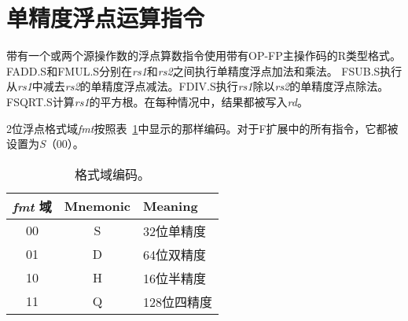 \section{单精度浮点运算指令}
\label{sec:single-float-compute}

带有一个或两个源操作数的浮点算数指令使用带有OP-FP主操作码的R类型格式。
FADD.S和FMUL.S分别在{\em rs1}和{\em rs2}之间执行单精度浮点加法和乘法。
FSUB.S执行从{\em rs1}中减去{\em rs2}的单精度浮点减法。FDIV.S执行{\em rs1}除以{\em rs2}的单精度浮点除法。
FSQRT.S计算{\em rs1}的平方根。在每种情况中，结果都被写入{\em rd}。

2位浮点格式域{\em fmt}按照表~\ref{tab:fmt}中显示的那样编码。对于F扩展中的所有指令，它都被设置为{\em S}（00）。

\begin{table}[htp]
\begin{small}
\begin{center}
\begin{tabular}{|c|c|l|}
\hline
{\em fmt} 域 &
Mnemonic &
Meaning \\
\hline
00 & S & 32位单精度\\
01 & D & 64位双精度\\
10 & H & 16位半精度\\
11 & Q & 128位四精度\\
\hline
\end{tabular}
\end{center}
\end{small}
\caption{格式域编码。
}
\label{tab:fmt}
\end{table}

